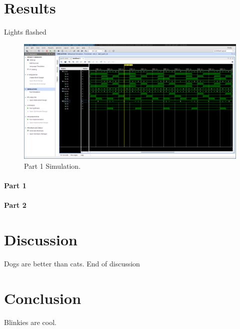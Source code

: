 \documentclass{article}
\begin{document}
    \section{Results}
    Lights flashed

    \begin{figure}[b!]
        \includegraphics[width=\linewidth]{MUX_DEMUX.png}
        \caption{Part 1 Simulation.}
        \label{fig:part1_sim}
    \end{figure}

    \paragraph{Part 1}


    \paragraph{Part 2}


    \section{Discussion}
    Dogs are better than cats.
    End of discussion

    \section{Conclusion}
    Blinkies are cool.
\end{document}
